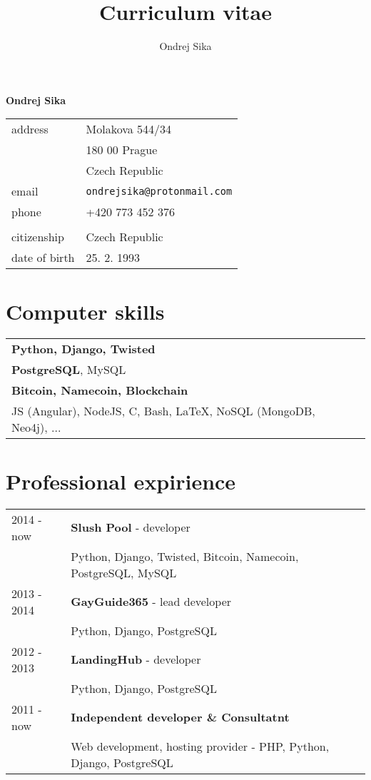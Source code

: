 \documentclass[12pt,a4paper]{article}
\title{Curriculum vitae}
\author{Ondrej Sika}
\begin{document}
\begin{center}
{\LARGE \bf Ondrej Sika}\\
\vspace*{0.2cm}
\begin{tabular}{R{7cm}L{7cm}}
address & Molakova 544/34\\
 & 180 00 Prague\\
 & Czech Republic\\
email & \texttt{ondrejsika@protonmail.com}\\
phone & +420 773 452 376\\
\\
citizenship & Czech Republic\\
date of birth & 25. 2. 1993\\
\end{tabular}
\end{center}

\section*{Computer skills}
\begin{tabular}{@{}ll}
{\bf Python, Django, Twisted} & \\
{\bf PostgreSQL}, MySQL & \\
{\bf Bitcoin, Namecoin, Blockchain} & \\
JS (Angular), NodeJS, C, Bash, LaTeX, NoSQL (MongoDB, Neo4j), ... & \\
\end{tabular}

\section*{Professional expirience}
\begin{tabular}{@{}p{2cm}l}
2014 - now & {\bf Slush Pool} - developer\\
 & Python, Django, Twisted, Bitcoin, Namecoin, PostgreSQL, MySQL\\
2013 - 2014 & {\bf GayGuide365} - lead developer\\
 & Python, Django, PostgreSQL\\
2012 - 2013 & {\bf LandingHub} - developer\\
 & Python, Django, PostgreSQL\\
2011 - now & {\bf Independent developer \& Consultatnt}\\
 & Web development, hosting provider - PHP, Python, Django, PostgreSQL\\
\end{tabular}
\end{document}
